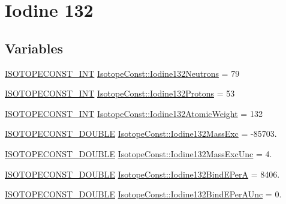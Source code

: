 \hypertarget{group___isotope_const-_iodine-_i132}{}\section{Iodine 132}
\label{group___isotope_const-_iodine-_i132}
\subsection*{Variables}
\begin{DoxyCompactItemize}
\item 
\mbox{\hyperlink{group___isotope_const-_macros_ga5f18360b3e99483a35c32d789e62621c}{I\+S\+O\+T\+O\+P\+E\+C\+O\+N\+S\+T\+\_\+\+I\+NT}} \mbox{\hyperlink{group___isotope_const-_iodine-_i132_ga3f8c47a501c929c368d58cb1b609d9fd}{Isotope\+Const\+::\+Iodine132\+Neutrons}} = 79
\item 
\mbox{\hyperlink{group___isotope_const-_macros_ga5f18360b3e99483a35c32d789e62621c}{I\+S\+O\+T\+O\+P\+E\+C\+O\+N\+S\+T\+\_\+\+I\+NT}} \mbox{\hyperlink{group___isotope_const-_iodine-_i132_gaae02b476564c58fa391c6507d91d729e}{Isotope\+Const\+::\+Iodine132\+Protons}} = 53
\item 
\mbox{\hyperlink{group___isotope_const-_macros_ga5f18360b3e99483a35c32d789e62621c}{I\+S\+O\+T\+O\+P\+E\+C\+O\+N\+S\+T\+\_\+\+I\+NT}} \mbox{\hyperlink{group___isotope_const-_iodine-_i132_gaea157853a007d2cc48e13678b0c3d059}{Isotope\+Const\+::\+Iodine132\+Atomic\+Weight}} = 132
\item 
\mbox{\hyperlink{group___isotope_const-_macros_ga8f45a7272ce02c0b4c65c44636ed719a}{I\+S\+O\+T\+O\+P\+E\+C\+O\+N\+S\+T\+\_\+\+D\+O\+U\+B\+LE}} \mbox{\hyperlink{group___isotope_const-_iodine-_i132_ga6a6ab88458c7acda3b6a7ca5b474f925}{Isotope\+Const\+::\+Iodine132\+Mass\+Exc}} = -\/85703.
\item 
\mbox{\hyperlink{group___isotope_const-_macros_ga8f45a7272ce02c0b4c65c44636ed719a}{I\+S\+O\+T\+O\+P\+E\+C\+O\+N\+S\+T\+\_\+\+D\+O\+U\+B\+LE}} \mbox{\hyperlink{group___isotope_const-_iodine-_i132_gaf379f4e6d884f15f8912e9f6806de5f8}{Isotope\+Const\+::\+Iodine132\+Mass\+Exc\+Unc}} = 4.
\item 
\mbox{\hyperlink{group___isotope_const-_macros_ga8f45a7272ce02c0b4c65c44636ed719a}{I\+S\+O\+T\+O\+P\+E\+C\+O\+N\+S\+T\+\_\+\+D\+O\+U\+B\+LE}} \mbox{\hyperlink{group___isotope_const-_iodine-_i132_ga0d6e1603974b97bf6742d0d75bc59f39}{Isotope\+Const\+::\+Iodine132\+Bind\+E\+PerA}} = 8406.
\item 
\mbox{\hyperlink{group___isotope_const-_macros_ga8f45a7272ce02c0b4c65c44636ed719a}{I\+S\+O\+T\+O\+P\+E\+C\+O\+N\+S\+T\+\_\+\+D\+O\+U\+B\+LE}} \mbox{\hyperlink{group___isotope_const-_iodine-_i132_ga4cd427f150fd4dad430590f00199e8bf}{Isotope\+Const\+::\+Iodine132\+Bind\+E\+Per\+A\+Unc}} = 0.

\end{DoxyCompactItemize}
